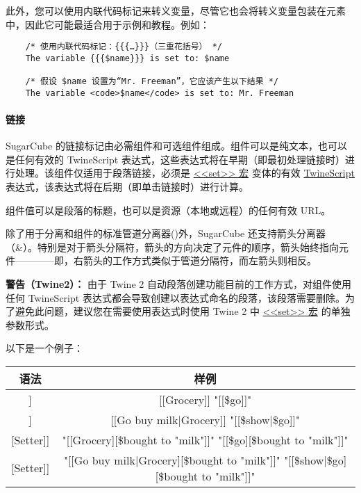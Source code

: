 \documentclass[hyperref,UTF8]{ctexart}
\begin{document}
此外，您可以使用内联代码标记来转义变量，尽管它也会将转义变量包装在元素中，因此它可能最适合用于示例和教程。例如：
\begin{lstlisting}
    /* 使用内联代码标记：{{{…}}}（三重花括号） */
    The variable {{{$name}}} is set to: $name
    
    /* 假设 $name 设置为“Mr. Freeman”，它应该产生以下结果 */
    The variable <code>$name</code> is set to: Mr. Freeman
\end{lstlisting}

\paragraph{链接}
SugarCube 的链接标记由必需组件和可选组件组成。组件可以是纯文本，也可以是任何有效的 TwineScript 表达式，这些表达式将在早期（即最初处理链接时）进行处理。该组件仅适用于段落链接，必须是 \href{https://www.motoslave.net/sugarcube/2/docs/#macros-macro-set}{<<set>> 宏} 变体的有效 \href{https://www.motoslave.net/sugarcube/2/docs/#twinescript-expressions}{TwineScript} 表达式，该表达式将在后期（即单击链接时）进行计算。

组件值可以是段落的标题，也可以是资源（本地或远程）的任何有效 URL。

除了用于分离和组件的标准管道分离器()外，SugarCube 还支持箭头分离器 （\&）。特别是对于箭头分隔符，箭头的方向决定了元件的顺序，箭头始终指向元件————即，右箭头的工作方式类似于管道分隔符，而左箭头则相反。

\textbf{警告（Twine2）：} 由于 Twine 2 自动段落创建功能目前的工作方式，对组件使用任何 TwineScript 表达式都会导致创建以表达式命名的段落，该段落需要删除。为了避免此问题，建议您在需要使用表达式时使用 Twine 2 中 \href{https://www.motoslave.net/sugarcube/2/docs/#macros-macro-set}{<<set>> 宏} 的单独参数形式。

以下是一个例子：
\begin{center}
    \begin{tabular}{c|c}
        \textbf{语法} & \textbf{样例}\\ \hline
        [[Link]] & \makecell{[[Grocery]] \\ "[[\$go]]"}\\ \hline
        [[Text|Link]] & \makecell{[[Go buy milk|Grocery]] \\ "[[\$show|\$go]]"}\\ \hline
        [[Link][Setter]] & \makecell{"[[Grocery][\$bought to "milk"]]" \\ "[[\$go][\$bought to "milk"]]"}\\ \hline
        [[Text|Link][Setter]] & \makecell{"[[Go buy milk|Grocery][\$bought to "milk"]]" \\ "[[\$show|\$go][\$bought to "milk"]]"}
    \end{tabular}
\end{center}
\end{document}

